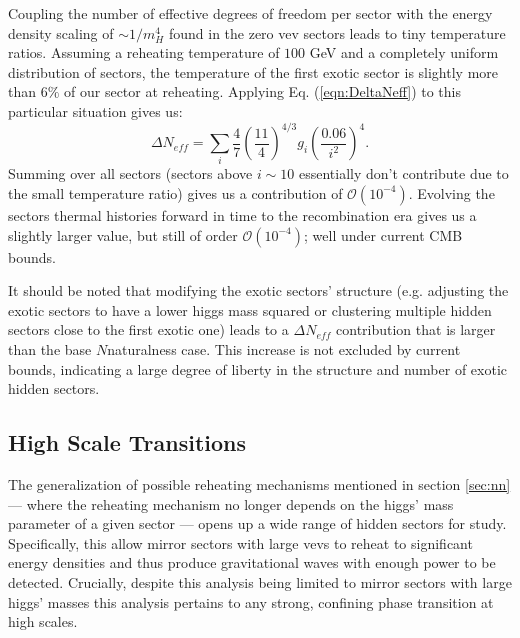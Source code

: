 \documentclass[nofootinbib,twocolumn,preprintnumbers]{revtex4-2}
\begin{document}
Coupling the number of effective degrees of freedom per sector with the energy density scaling of $\sim 1/m_H^4$ found in the zero vev sectors leads to tiny temperature ratios. Assuming a reheating temperature of $100$ GeV and a completely uniform distribution of sectors, the temperature of the first exotic sector is slightly more than $6\%$ of our sector at reheating. Applying Eq. (\ref{eqn:DeltaNeff}) to this particular situation gives us:
\begin{equation}
\Delta N_{eff} = \sum_i \frac{4}{7}\left(\frac{11}{4}\right)^{4/3}g_{i} \left(\frac{0.06}{i^2}\right)^4.
\end{equation}     
Summing over all sectors (sectors above $i \sim 10$ essentially don't contribute due to the small temperature ratio) gives us a contribution of $\mathcal{O} (10^{-4})$. Evolving the sectors thermal histories forward in time to the recombination era gives us a slightly larger value, but still of order $\mathcal{O}(10^{-4})$; well under current CMB bounds. 

It should be noted that modifying the exotic sectors' structure (e.g. adjusting the exotic sectors to have a lower higgs mass squared or clustering multiple hidden sectors close to the first exotic one) leads to a $\Delta N_{eff}$ contribution that is larger than the base $N$naturalness case. This increase is not excluded by current bounds, indicating a large degree of liberty in the structure and number of exotic hidden sectors.

\subsection{High Scale Transitions}

The generalization of possible reheating mechanisms mentioned in section \ref{sec:nn} --- where the reheating mechanism no longer depends on the higgs' mass parameter of a given sector --- opens up a wide range of hidden sectors for study. Specifically, this allow mirror sectors with large vevs to reheat to significant energy densities and thus produce gravitational waves with enough power to be detected. Crucially, despite this analysis being limited to mirror sectors with large higgs' masses this analysis pertains to any strong, confining phase transition at high scales.
\end{document}
